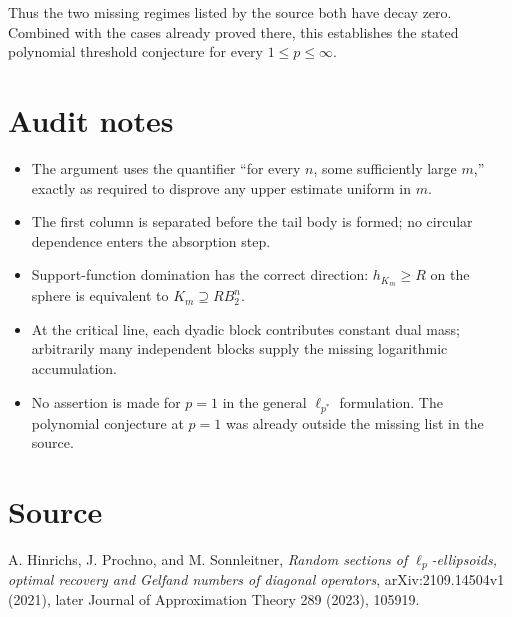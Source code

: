 \documentclass[11pt]{article}
\begin{document}
Thus the two missing regimes listed by the source both have decay zero.  Combined with the cases already proved there, this establishes the stated polynomial threshold conjecture for every $1\leq p\leq\infty$.

\section*{Audit notes}
\begin{itemize}[leftmargin=1.4em,itemsep=2pt]
\item The argument uses the quantifier ``for every $n$, some sufficiently large $m$,'' exactly as required to disprove any upper estimate uniform in $m$.
\item The first column is separated before the tail body is formed; no circular dependence enters the absorption step.
\item Support-function domination has the correct direction: $h_{K_m}\geq R$ on the sphere is equivalent to $K_m\supseteq RB_2^n$.
\item At the critical line, each dyadic block contributes constant dual mass; arbitrarily many independent blocks supply the missing logarithmic accumulation.
\item No assertion is made for $p=1$ in the general $\ell_{p^*}$ formulation.  The polynomial conjecture at $p=1$ was already outside the missing list in the source.
\end{itemize}

\section*{Source}
A. Hinrichs, J. Prochno, and M. Sonnleitner,
\emph{Random sections of $\ell_p$-ellipsoids, optimal recovery and Gelfand numbers of diagonal operators}, arXiv:2109.14504v1 (2021), later Journal of Approximation Theory 289 (2023), 105919.
\end{document}
